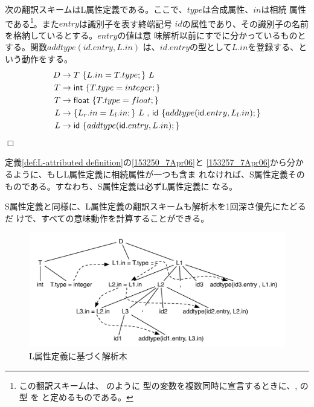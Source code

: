 \begin{example}
 次の翻訳スキームはL属性定義である。ここで、$type$は合成属性、$in$は相続
 属性である\footnote{この翻訳スキームは、 のように
 型の変数を複数同時に宣言するときに、, の型
 を と定めるものである。}。また$entry$は識別子を表す終端記号
 $id$の属性であり、その識別子の名前を格納しているとする。$entry$の値は意
 味解析以前にすでに分かっているものとする。関数$addtype(id.entry, L.in)$
 は、$id.entry$の型として$L.in$を登録する、という動作をする。
 \begin{align*}
  D & \rightarrow T\ \{ L.in = T.type; \}\ L \\
  T & \rightarrow \icode{int}\ \{ T.type = integer; \} \\
  T & \rightarrow \icode{float}\ \{ T.type = float; \} \\
  L & \rightarrow \{ L_r.in = L_l.in; \}\ L\ \icode{,}\ \icode{id}\ \{ addtype(\icode{id}.entry, L_l.in); \}\\
  L & \rightarrow \icode{id}\ \{ addtype(\icode{id}.entry, L.in); \}
 \end{align*}$\Box$
 \label{example:L-attributed translation scheme}
\end{example}

定義\ref{def:L-attributed definition}の\ref{153250_7Apr06}と
\ref{153257_7Apr06}から分かるように、もしL属性定義に相続属性が一つも含ま
れなければ、S属性定義そのものである。すなわち、S属性定義は必ずL属性定義に
なる。

S属性定義と同様に、L属性定義の翻訳スキームも解析木を1回深さ優先にたどるだ
けで、すべての意味動作を計算することができる。

\begin{figure}
 \begin{center}
  \includegraphics[width=13cm]{figure/L_attr_translation_scheme.pdf}
 \end{center}
 \caption{L属性定義に基づく解析木}
 \label{170525_7Apr06}
\end{figure}

